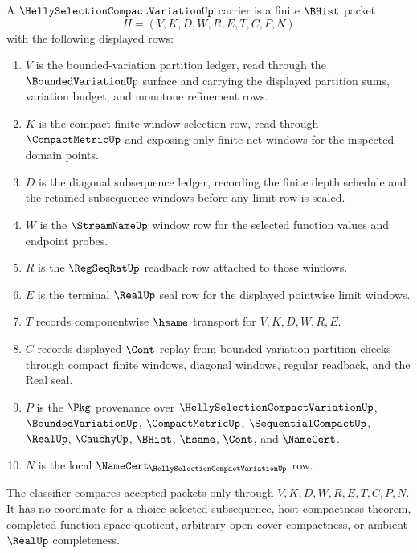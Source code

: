 \begin{definition}
\label{def:helly-selection-compact-variation-carrier}
A $\HellySelectionCompactVariationUp$ carrier is a finite $\BHist$ packet
$$
H=(V,K,D,W,R,E,T,C,P,N)
$$
with the following displayed rows:
\begin{enumerate}
\item $V$ is the bounded-variation partition ledger, read through the $\BoundedVariationUp$ surface and carrying the displayed partition sums, variation budget, and monotone refinement rows.
\item $K$ is the compact finite-window selection row, read through $\CompactMetricUp$ and exposing only finite net windows for the inspected domain points.
\item $D$ is the diagonal subsequence ledger, recording the finite depth schedule and the retained subsequence windows before any limit row is sealed.
\item $W$ is the $\StreamNameUp$ window row for the selected function values and endpoint probes.
\item $R$ is the $\RegSeqRatUp$ readback row attached to those windows.
\item $E$ is the terminal $\RealUp$ seal row for the displayed pointwise limit windows.
\item $T$ records componentwise $\hsame$ transport for $V,K,D,W,R,E$.
\item $C$ records displayed $\Cont$ replay from bounded-variation partition checks through compact finite windows, diagonal windows, regular readback, and the Real seal.
\item $P$ is the $\Pkg$ provenance over $\HellySelectionCompactVariationUp$, $\BoundedVariationUp$, $\CompactMetricUp$, $\SequentialCompactUp$, $\RealUp$, $\CauchyUp$, $\BHist$, $\hsame$, $\Cont$, and $\NameCert$.
\item $N$ is the local $\NameCert_{\HellySelectionCompactVariationUp}$ row.
\end{enumerate}
The classifier compares accepted packets only through $V,K,D,W,R,E,T,C,P,N$. It has no coordinate for a choice-selected subsequence, host compactness theorem, completed function-space quotient, arbitrary open-cover compactness, or ambient $\RealUp$ completeness.
\end{definition}

